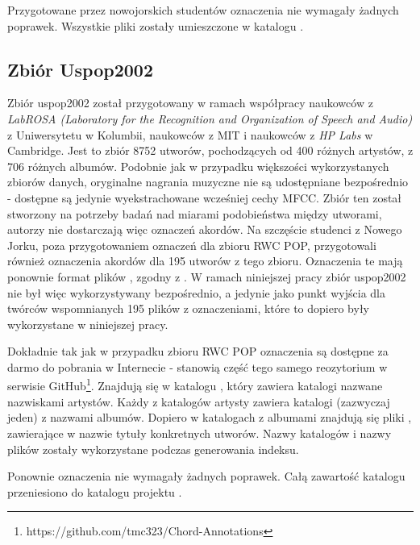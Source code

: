 Przygotowane przez nowojorskich studentów oznaczenia nie wymagały żadnych poprawek. Wszystkie pliki
 zostały umieszczone w katalogu .

\subsection{Zbiór Uspop2002}

Zbiór uspop2002 \cite{berenzweig_large-scale_2004} został przygotowany w ramach współpracy naukowców
z \emph{LabROSA (Laboratory for the Recognition and Organization of Speech and Audio)} z
Uniwersytetu w Kolumbii, naukowców z MIT i naukowców z \emph{HP Labs} w Cambridge. Jest to zbiór
8752 utworów, pochodzących od 400 różnych artystów, z 706 różnych albumów. Podobnie jak w przypadku
większości wykorzystanych zbiorów danych, oryginalne nagrania muzyczne nie są udostępniane
bezpośrednio - dostępne są jedynie wyekstrachowane wcześniej cechy MFCC. Zbiór ten został stworzony
na potrzeby badań nad miarami podobieństwa między utworami, autorzy nie dostarczają więc oznaczeń
akordów. Na szczęście studenci z Nowego Jorku, poza przygotowaniem oznaczeń dla zbioru RWC POP,
przygotowali również oznaczenia akordów dla 195 utworów z tego zbioru. Oznaczenia te mają ponownie
format plików , zgodny z \cite{harte_towards_nodate}. W ramach niniejszej pracy zbiór
uspop2002 nie był więc wykorzystywany bezpośrednio, a jedynie jako punkt wyjścia dla twórców
wspomnianych 195 plików z oznaczeniami, które to dopiero były wykorzystane w niniejszej pracy.

Dokładnie tak jak w przypadku zbioru RWC POP oznaczenia są dostępne za darmo do pobrania w
Internecie - stanowią część tego samego reozytorium w serwisie
GitHub\footnote{https://github.com/tmc323/Chord-Annotations}. Znajdują się w katalogu
, który zawiera katalogi nazwane nazwiskami artystów. Każdy z katalogów artysty
zawiera katalogi (zazwyczaj jeden) z nazwami albumów. Dopiero w katalogach z albumami znajdują się
pliki , zawierające w nazwie tytuły konkretnych utworów. Nazwy katalogów i nazwy plików
zostały wykorzystane podczas generowania indeksu.

Ponownie oznaczenia nie wymagały żadnych poprawek. Całą zawartość katalogu 
przeniesiono do katalogu projektu .

